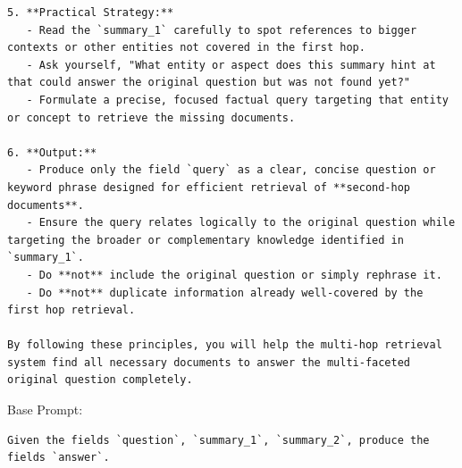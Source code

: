 \begin{instructbox}
\begin{lstlisting}[breakindent=0pt, breaklines=true, breakatwhitespace=true, frame=single, backgroundcolor=\color{blue!10}]
5. **Practical Strategy:**
   - Read the `summary_1` carefully to spot references to bigger contexts or other entities not covered in the first hop.
   - Ask yourself, "What entity or aspect does this summary hint at that could answer the original question but was not found yet?"
   - Formulate a precise, focused factual query targeting that entity or concept to retrieve the missing documents.

6. **Output:**
   - Produce only the field `query` as a clear, concise question or keyword phrase designed for efficient retrieval of **second-hop documents**.
   - Ensure the query relates logically to the original question while targeting the broader or complementary knowledge identified in `summary_1`.
   - Do **not** include the original question or simply rephrase it.
   - Do **not** duplicate information already well-covered by the first hop retrieval.

By following these principles, you will help the multi-hop retrieval system find all necessary documents to answer the multi-faceted original question completely.
\end{lstlisting}
\end{instructbox}\begin{instructbox}
Base Prompt:
\begin{lstlisting}[breakindent=0pt, breaklines=true, breakatwhitespace=true, frame=single, backgroundcolor=\color{gray!10}]
Given the fields `question`, `summary_1`, `summary_2`, produce the fields `answer`.
\end{lstlisting}


\end{instructbox}
